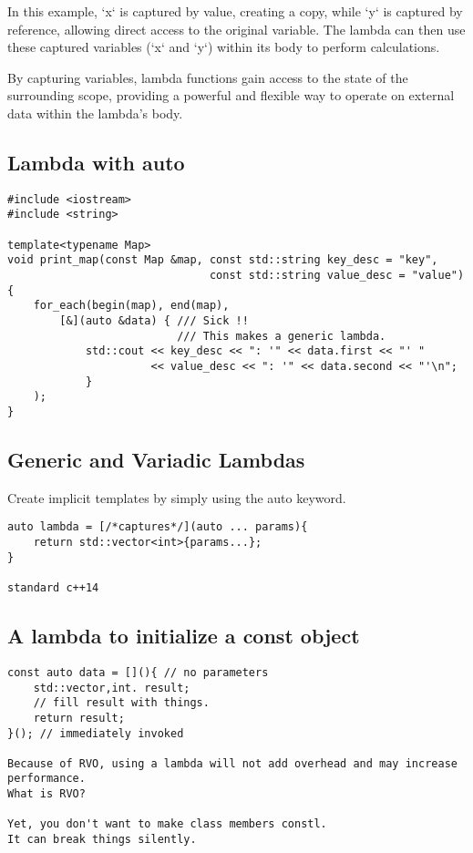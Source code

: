 \documentclass[openany]{report}
\begin{document}
In this example, `x` is captured by value,
creating a copy, while `y` is captured by reference,
allowing direct access to the original variable.
The lambda can then use these captured variables (`x` and `y`)
within its body to perform calculations.

By capturing variables, lambda functions gain access to the state of the surrounding scope, providing a powerful and flexible way to operate on external data within the lambda's body.

\subsection{Lambda with auto}
\begin{verbatim}
#include <iostream>
#include <string>

template<typename Map>
void print_map(const Map &map, const std::string key_desc = "key",
                               const std::string value_desc = "value")
{
    for_each(begin(map), end(map),
        [&](auto &data) { /// Sick !!
                          /// This makes a generic lambda.
            std::cout << key_desc << ": '" << data.first << "' "
                      << value_desc << ": '" << data.second << "'\n";
            }
    );
}
\end{verbatim}

\subsection{Generic and Variadic Lambdas}

Create implicit templates by simply using the auto keyword.

\begin{verbatim}
auto lambda = [/*captures*/](auto ... params){
    return std::vector<int>{params...};
}

standard c++14
\end{verbatim}

\subsection{A lambda to initialize a const object}

\begin{verbatim}
const auto data = [](){ // no parameters
    std::vector,int. result;
    // fill result with things. 
    return result;
}(); // immediately invoked

Because of RVO, using a lambda will not add overhead and may increase performance.
What is RVO?

Yet, you don't want to make class members constl.
It can break things silently. 
\end{verbatim}
\end{document}
